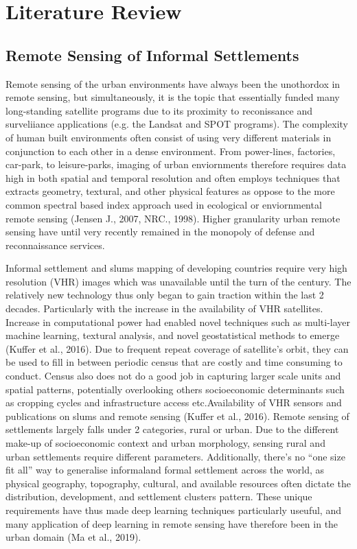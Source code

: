 \documentclass[11pt, a4paper, twoside]{report}
\begin{document}
\chapter{Literature Review}\label{LitReview}

\section{Remote Sensing of Informal Settlements}\label{RSofInformalSettlement}
Remote sensing of the urban environments have always been the unothordox in remote sensing, but simultaneously, it is the topic that essentially funded many long-standing satellite programs due to its proximity to reconissance and surveliiance applications (e.g. the Landsat and SPOT programs). The complexity of human built environments often consist of using very different materials in conjunction to each other in a dense environment. From power-lines, factories, car-park, to leisure-parks, imaging of urban enviornments therefore requires data high in both spatial and temporal resolution and often employs techniques that extracts geometry, textural, and other physical features as oppose to the more common spectral based index approach used in ecological or enviornmental remote sensing (Jensen J., 2007, NRC., 1998). Higher granularity urban remote sensing have until very recently remained in the monopoly of defense and reconnaissance services.\\\par

Informal settlement and slums mapping of developing countries require very high resolution (VHR) images which was unavailable until the turn of the century. The relatively new technology thus only began to gain traction within the last 2 decades. Particularly with the increase in the availability of VHR satellites. Increase in computational power had enabled novel techniques such as multi-layer machine learning, textural analysis, and novel geostatistical methods to emerge (Kuffer et al., 2016). Due to frequent repeat coverage of satellite’s orbit, they can be used to fill in between periodic census that are costly and time consuming to conduct. Census also does not do a good job in capturing larger scale units and spatial patterns, potentially overlooking others socioeconomic determinants such as cropping cycles and infrastructure access etc.Availability of VHR sensors and publications on slums and remote sensing (Kuffer et al., 2016). Remote sensing of settlements largely falls under 2 categories, rural or urban. Due to the different make-up of socioeconomic context and urban morphology, sensing rural and urban settlements require different parameters. Additionally, there’s no “one size fit all” way to generalise informaland formal settlement across the world, as physical geography, topography, cultural, and available resources often dictate the distribution, development, and settlement clusters pattern. These unique requirements have thus made deep learning techniques particularly useuful, and many application of deep learning in remote sensing have therefore been in the urban domain (Ma et al., 2019).
\end{document}
